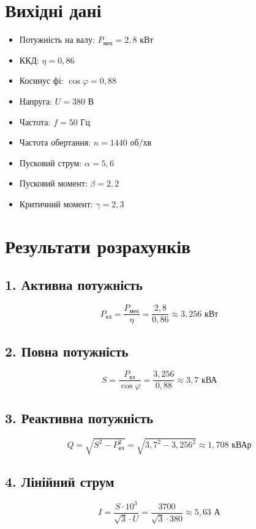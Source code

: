 \documentclass[a4paper]{article}
\begin{document}
\section*{Вихідні дані}
\begin{itemize}
    \item Потужність на валу: $P_{\text{мех}} = 2{,}8 \text{ кВт}$
    \item ККД: $\eta = 0{,}86$
    \item Косинус фі: $\cos \varphi = 0{,}88$
    \item Напруга: $U = 380 \text{ В}$
    \item Частота: $f = 50 \text{ Гц}$
    \item Частота обертання: $n = 1440 \text{ об/хв}$
    \item Пусковий струм: $\alpha = 5{,}6$
    \item Пусковий момент: $\beta = 2{,}2$
    \item Критичний момент: $\gamma = 2{,}3$
\end{itemize}

\section*{Результати розрахунків}

\subsection*{1. Активна потужність}
\[
P_{\text{ел}} = \frac{P_{\text{мех}}}{\eta} = \frac{2{,}8}{0{,}86} \approx 3{,}256 \text{ кВт}
\]

\subsection*{2. Повна потужність}
\[
S = \frac{P_{\text{ел}}}{\cos \varphi} = \frac{3{,}256}{0{,}88} \approx 3{,}7 \text{ кВА}
\]

\subsection*{3. Реактивна потужність}
\[
Q = \sqrt{S^2 - P_{\text{ел}}^2} = \sqrt{3{,}7^2 - 3{,}256^2} \approx 1{,}708 \text{ кВАр}
\]

\subsection*{4. Лінійний струм}
\[
I = \frac{S \cdot 10^3}{\sqrt{3} \cdot U} = \frac{3700}{\sqrt{3} \cdot 380} \approx 5{,}63 \text{ А}
\]
\end{document}
